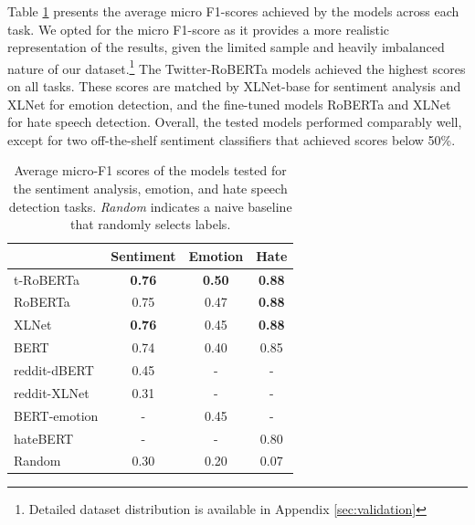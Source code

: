 Table \ref{tab:models_evaluation} presents the average micro F1-scores achieved by the models across each task. We opted for the micro F1-score as it provides a more realistic representation of the results, given the limited sample and heavily imbalanced nature of our dataset.\footnote{Detailed dataset distribution is available in Appendix \ref{sec:validation}} The Twitter-RoBERTa models achieved the highest scores on all tasks.%
These scores are matched by XLNet-base for sentiment analysis and XLNet for emotion detection, and the fine-tuned models RoBERTa and XLNet for hate speech detection. %
Overall, the tested models performed comparably well, except for two off-the-shelf sentiment classifiers that achieved scores below 50\%. %

\begin{table}[h]
\centering
\begin{tabular}{l|c|c|c}
\hline
\textbf{}    & \textbf{Sentiment} & \textbf{Emotion} & \textbf{Hate} \\ \hline
t-RoBERTa    & \textbf{0.76}      & \textbf{0.50}    & \textbf{0.88}          \\
RoBERTa    & 0.75               & 0.47             & \textbf{0.88}          \\
XLNet      & \textbf{0.76}      & 0.45             & \textbf{0.88}         \\
BERT       & 0.74               & 0.40             & 0.85          \\
reddit-dBERT & 0.45               & -                & -             \\
reddit-XLNet & 0.31               & -                & -             \\
BERT-emotion & -                  & 0.45             & -             \\
hateBERT     & -                  & -                & 0.80          \\ 
Random     &  0.30                  & 0.20                & 0.07         \\ \hline
\end{tabular}
\caption{Average micro-F1 scores of the models tested for the sentiment analysis, emotion, and hate speech detection tasks. \textit{Random} indicates a naive baseline that randomly selects labels.}
\label{tab:models_evaluation}
\end{table}

